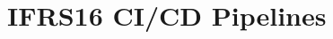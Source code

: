 
\setcounter{chapter}{1}
\chapter{IFRS16 CI/CD Pipelines}
\minitoc %
\graphicspath{{Chapitre2/figures/}}


\pagestyle{fancy}
\fancyhf{}
\fancyhead[R]{\bfseries\rightmark}
\fancyfoot[R]{\thepage}
\renewcommand{\headrulewidth}{0.5pt}
\renewcommand{\footrulewidth}{0pt}
\renewcommand{\chaptermark}[1]{\markboth{\MakeUppercase{\chaptername~\thechapter. #1 }}{}}
\renewcommand{\sectionmark}[1]{\markright{\thechapter.\thesection~ #1}}

